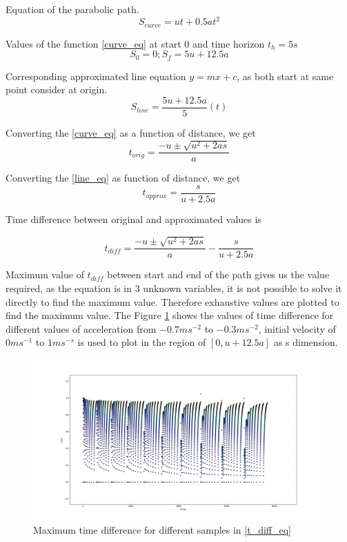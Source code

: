 Equation of the parabolic path. 
\begin{equation}
\label{curve_eq}
S_{curve} = ut + 0.5at^2
\end{equation}

Values of the function \ref{curve_eq} at start $0$ and time horizon $t_h = 5s$ 
\begin{equation}
S_0 = 0; S_f = 5u + 12.5a
\end{equation}

Corresponding approximated line equation $y=mx+c$, as both start at same point consider at origin. 
\begin{equation}
\label{line_eq}
S_{line} = \frac{5u+12.5a}{5}(t)
\end{equation}

Converting the \ref{curve_eq} as a function of distance, we get
\begin{equation}
t_{orig} = \frac{-u \pm \sqrt{u^2 + 2as}}{a}
\end{equation}

Converting the \ref{line_eq} as function of distance, we get
\begin{equation}
\label{line_eq}
t_{approx} = \frac{s}{u+2.5a}
\end{equation}

Time difference between original and approximated values is 

\begin{equation}
\label{t_diff_eq}
t_{diff} = \frac{-u \pm \sqrt{u^2 + 2as}}{a} - \frac{s}{u+2.5a}
\end{equation}

Maximum value of $t_{diff}$ between start and end of the path gives us the value required, as the equation is in 3 unknown variables, it is not possible to solve it directly to find the maximum value. Therefore exhaustive values are plotted to find the maximum value. The Figure \ref{time_diff_plot} shows the values of time difference for different values of acceleration from $-0.7ms^{-2}$ to $-0.3ms^{-2}$, initial velocity of $0ms^{-1}$ to $1ms^{-s}$ is used to plot in the region of $[0,u+12.5a]$ as s dimension. 

\begin{figure}[H]
	\centering
	\includegraphics[width=1.0\textwidth]{Images/appendix/time_diff.png}
	\caption{Maximum time difference for different samples in \ref{t_diff_eq}}
	\label{time_diff_plot}
\end{figure}

